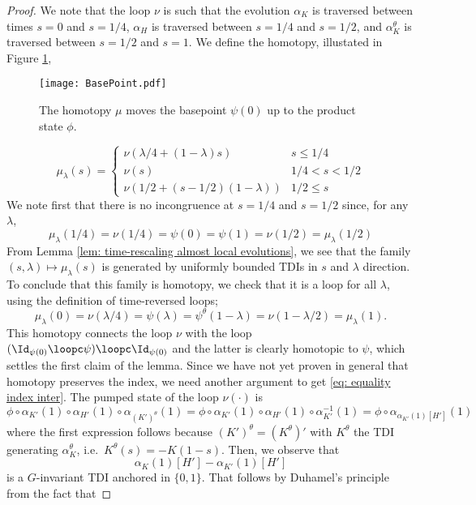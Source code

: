 \begin{proof}
	We note that the loop $\nu$ is such that the evolution  ${\alpha_{K}}$ is traversed between times $s=0$ and $s=1/4$, $\alpha_{H}$ is traversed between $s=1/4$ and $s=1/2$, and ${\alpha^\theta_{K}}$ is traversed between $s=1/2$ and $s=1$. We define the homotopy, illustated in   Figure \ref{fig: homotopytoproductbase}, 
	\begin{figure}[h] 
		\begin{center}
			\texttt{[image: BasePoint.pdf]}
			\caption{The homotopy $\mu$ moves the basepoint $\psi(0)$ up to the product state $\phi$.}
			\label{fig: homotopytoproductbase}
		\end{center}
	\end{figure}
	$$
	\mu_\lambda(s) = \begin{cases}  \nu(\lambda/4+(1-\lambda)s )  &   s\leq 1/4 \\
		\nu(s)&   1/4 < s < 1/2 \\
		\nu(1/2 + (s-1/2)(1-\lambda) )   &     1/2\leq s
	\end{cases}
	$$
	We note first that there is no incongruence at $s=1/4$ and $s=1/2$ since, for any $\lambda$, 
	$$
	\mu_\lambda(1/4)= \nu(1/4 ) = \psi(0)=\psi(1)=   \nu(1/2 ) =  \mu_\lambda(1/2)
	$$
	From Lemma \ref{lem: time-rescaling almost local evolutions}, we see that the family $(s,\lambda)\mapsto \mu_\lambda(s)$ is generated by uniformly bounded TDIs in $s$ and $\lambda$ direction. To conclude that this family is homotopy, we check that it is a loop for all $\lambda$, using the definition of time-reversed loops;
	$$
	\mu_\lambda(0) =\nu(\lambda/4 )=\psi(\lambda) ={\psi^\theta}(1-\lambda)= \nu(1-\lambda/2)=         \mu_\lambda(1). $$
	This homotopy connects the loop $\nu$ with the loop $(\Id_{\psi(0)} \loopc \psi) \loopc  \Id_{\psi(0)}$ and the latter is clearly homotopic to $\psi$, which settles the first claim of the lemma. 
	Since we have not yet proven in general that homotopy preserves the index,  we need another argument to get \eqref{eq: equality index inter}.  The pumped state of the loop $\nu(\cdot)$ is
	$$
	\phi \circ   \alpha_{K'}(1)\circ \alpha_{H'}(1) \circ \alpha_{(K')^\theta}(1)=  
	\phi \circ   \alpha_{K'}(1)\circ \alpha_{H'}(1) \circ  \alpha_{K'}^{-1}(1) = 
	\phi \circ \alpha_{\alpha_{K'}(1)[H']}(1)
	$$
	where the first expression follows because  $(K')^\theta=(K^\theta)'$ with $K^\theta$ the TDI generating ${\alpha^\theta_K}$, i.e.\ ${K^\theta(s)}=-K(1-s)$. 
	Then, we observe that 
	$$
	\alpha_{K}(1)[H']-\alpha_{K'}(1)[H']
	$$
	is a $G$-invariant TDI anchored in $\{0,1\}$. That follows by Duhamel's principle from  the fact that 

\end{proof}
